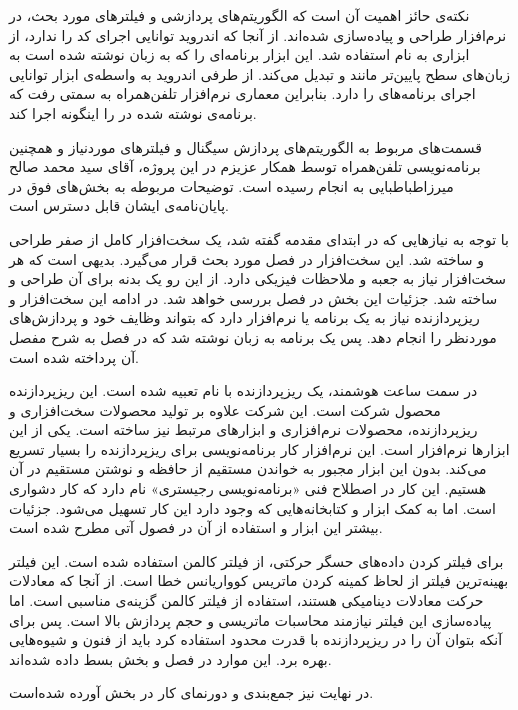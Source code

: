 نکته‌ی حائز اهمیت آن است که الگوریتم‌های پردازشی و فیلترهای مورد بحث، در نرم‌افزار  طراحی و پیاده‌سازی شده‌اند. از آنجا که اندروید توانایی اجرای کد  را ندارد، از ابزاری به نام  استفاده شد. این ابزار برنامه‌ای را که به زبان  نوشته شده است به زبان‌های سطح پایین‌تر مانند  و  تبدیل می‌کند. از طرفی اندروید به واسطه‌ی ابزار  توانایی اجرای برنامه‌های  را دارد. بنابراین معماری نرم‌افزار تلفن‌همراه به سمتی رفت که برنامه‌ی نوشته شده در  را اینگونه اجرا کند.

قسمت‌های مربوط به الگوریتم‌های پردازش سیگنال  و فیلترهای موردنیاز و همچنین برنامه‌نویسی تلفن‌همراه توسط همکار عزیزم در این پروژه، آقای سید محمد صالح میرزاطباطبایی به انجام رسیده است. توضیحات مربوطه به بخش‌های فوق در پایان‌نامه‌ی ایشان قابل دسترس است.

با توجه به نیازهایی که در ابتدای مقدمه گفته شد، یک سخت‌افزار کامل از صفر طراحی و ساخته شد. این سخت‌افزار در فصل  مورد بحث قرار می‌گیرد. بدیهی است که هر سخت‌افزار نیاز به جعبه و ملاحظات فیزیکی دارد. از این رو یک بدنه برای آن طراحی و ساخته شد. جزئیات این بخش در فصل  بررسی خواهد شد. در ادامه این سخت‌افزار و ریزپردازنده نیاز به یک برنامه یا نرم‌افزار دارد که بتواند وظایف خود و پردازش‌های موردنظر را انجام دهد. پس یک برنامه به زبان  نوشته شد که در فصل  به شرح مفصل آن پرداخته شده است.

در سمت ساعت هوشمند، یک ریزپردازنده با نام  تعبیه شده است. این ریزپردازنده محصول شرکت  است. این شرکت علاوه بر تولید محصولات سخت‌افزاری و ریزپردازنده، محصولات نرم‌افزاری و ابزارهای مرتبط نیز ساخته است. یکی از این ابزارها نرم‌افزار  است. این نرم‌افزار کار برنامه‌نویسی برای ریزپردازنده را بسیار تسریع می‌کند. بدون این ابزار مجبور به خواندن مستقیم از حافظه و نوشتن مستقیم در آن هستیم. این کار در اصطلاح فنی «برنامه‌نویسی رجیستری» نام دارد که کار دشواری است. اما به کمک ابزار  و کتابخانه‌هایی که وجود دارد این کار تسهیل می‌شود. جزئیات بیشتر این ابزار و استفاده از آن در فصول آتی مطرح شده است.

برای فیلتر کردن داده‌های حسگر حرکتی، از فیلتر کالمن استفاده شده است. این فیلتر بهینه‌ترین فیلتر از لحاظ کمینه کردن ماتریس کوواریانس خطا است. از آنجا که معادلات حرکت معادلات دینامیکی هستند، استفاده از فیلتر کالمن گزینه‌ی مناسبی است. اما پیاده‌سازی این فیلتر نیازمند محاسبات ماتریسی و حجم پردازش بالا است. پس برای آنکه بتوان آن را در ریزپردازنده با قدرت محدود استفاده کرد باید از فنون و شیوه‌هایی بهره برد. این موارد در فصل  و بخش  بسط داده شده‌اند.

در نهایت نیز جمع‌بندی و دورنمای کار در بخش  آورده شده‌است.